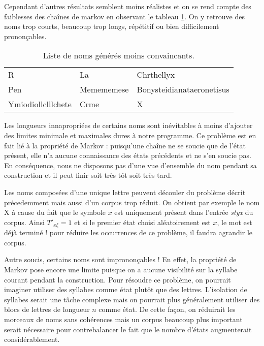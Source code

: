 \documentclass[12pt]{article}
\begin{document}
Cependant d'autres résultats semblent moins réalistes et on se rend
compte des faiblesses des chaînes de markov en observant le tableau
\ref{pasbons}. On y retrouve des noms trop courts, beaucoup trop
longs, répétitif ou bien difficilement prononçables.

\begin{table}[H]
  \centering

  \begin{tabular}{l|l|l}
    R & La & Chrthellyx \\
    Pen & Memememese & Bonysteidianataeronetisus \\
    Ymiodiollclllchete & Crme & X
  \end{tabular}

  \caption{Liste de noms générés moins convaincants.}
  \label{pasbons}

\end{table}

Les longueurs innapropriées de certains noms sont inévitables à moins
d'ajouter des limites minimale et maximales dures à notre
programme. Ce problème est en fait lié à la propriété de Markov :
puisqu'une chaîne ne se soucie que de l'état présent, elle n'a aucune
connaissance des états précédents et ne s'en soucie pas. En
conséquence, nous ne disposons pas d'une vue d'ensemble du nom pendant
sa construction et il peut finir soit très tôt soit très tard.

Les noms composées d'une unique lettre peuvent découler du problème
décrit précedemment mais aussi d'un corpus trop réduit. On obtient par
exemple le nom X à cause du fait que le symbole $x$ est uniquement
présent dans l'entrée \textit{styx} du corpus. Ainsi ${T'}_{x\xi} = 1$
et si le premier état choisi aléatoirement est $x$, le mot est déjà
terminé ! pour réduire les occurrences de ce problème, il faudra
agrandir le corpus.

Autre soucis, certains noms sont imprononçables ! En effet, la
propriété de Markov pose encore une limite puisque on a aucune
visibilité sur la syllabe courant pendant la construction. Pour
résoudre ce problème, on pourrait imaginer utiliser des syllabes comme
état plutôt que des lettres. L'isolation de syllabes serait une tâche
complexe mais on pourrait plus généralement utiliser des blocs de
lettres de longueur $n$ comme état. De cette façon, on réduirait les
morceaux de noms sans cohérences mais un corpus beaucoup plus
important serait nécessaire pour contrebalancer le fait que le nombre
d'états augmenterait considérablement.



\end{document}

